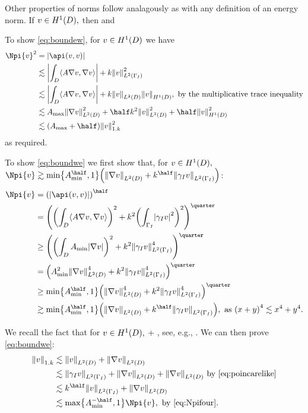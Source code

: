 Other properties of norms follow analagously as with any definition of an energy norm.
\epf
{}\label{lem:normbound}
If $v \in \HoD,$ then
\beq\label{eq:boundew}
 \lesssim \sqrt{\Amax+\half}
\eeq
and
\beq\label{eq:boundwe}
 \lesssim \max{} 
\eeq
\ele

To show \eqref{eq:boundew}, for $ v \in \HoD$ we have
\begin{align*}
  \Npi{v}^2 &= \abs{\api(v,v)}\\
            &\lesssim \abs{\int_{D} \IP{A \grad v}{\grad v}} + k\NLtGI{v}^2 \\
            &\lesssim \abs{\int_{D} \IP{A \grad v}{\grad v}} + k\NLtD{v}\NHoD{v}, \text{ by the multiplicative trace inequality}\\
            &\lesssim \Amax \NLtD{\grad v}^2 + \half k^2 \NLtD{v}^2 + \half \NHoD{v}^2\\
  &\lesssim \mleft(\Amax+\half\mright)\NW{v}^2
\end{align*}
as required.

To show \eqref{eq:boundwe} we first show that, for $v \in \HoD,$ $\Npi{v} \gtrsim \min\set{\Amin^{\half},1} \mleft(\NLtD{\grad v} + k^{\half} \NLtGI{\trGI v}\mright)$:
\begin{align}
  \Npi{v} &= \mleft(\abs{\api(v,v)}\mright)^{\half}\nonumber\\
          &= \mleft(\mleft(\int_D \IP{A \grad v}{\grad v}\mright)^2 + k^2 \mleft(\int_{\GI}\abs{\trGI v}^2\mright)^2\mright)^{\quarter}\nonumber\\
  &\geq \mleft(\mleft(\int_D \Amin \abs{\grad v}\mright)^2 + k^2 \NLtGI{\trGI v}^4\mright)^{\quarter}\nonumber\\
          &= \mleft(\Amin^2 \NLtD{\grad v}^4 + k^2 \NLtGI{\trGI v}^4\mright)^{\quarter}\nonumber\\
          &\geq \min\set{\Amin^{\half},1}\mleft(\NLtD{\grad v}^4 + k^2 \NLtGI{\trGI v}^4\mright)^{\quarter}\nonumber\\
  &\gtrsim \min\set{\Amin^{\half},1} \mleft(\NLtD{\grad v} + k^{\half} \NLtGI{\trGI v}\mright), \text{ as } \mleft(x+y\mright)^4 \lesssim x^4 + y^4.\label{eq:Npifour}
\end{align}

We recall the fact that for $v \in \HoD,$
\beq\label{eq:poincarelike}
 \lesssim {} + ,
\eeq
see, e.g., \cite[Equation (6.16)]{Sp:15}. We can then prove \eqref{eq:boundwe}:
\begin{align*}
   \NW{v} &\lesssim \NLtD{v}+ \NLtD{\grad v}\\
          &\lesssim \NLtGI{\trGI v}+ \NLtD{\grad v} + \NLtD{\grad v}\text{ by \eqref{eq:poincarelike}}\\
          &\lesssim k^{\half}\NLtGI{v} + \NLtD{\grad v}\\
  &\lesssim \max\set{\Amin^{-\half},1}\Npi{v}, \text{ by \eqref{eq:Npifour}.}
\end{align*}
\epf

